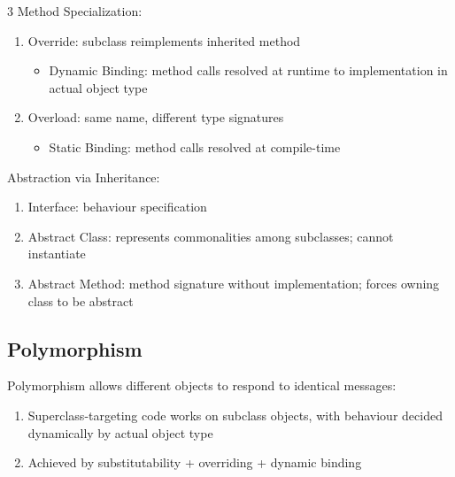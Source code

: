 \documentclass[12pt, a4paper]{article}
\begin{document}
\begin{multicols*}{3}
Method Specialization:
\begin{enumerate}[\roman*.]
  \item Override: subclass reimplements inherited method
    \begin{itemize}[leftmargin=*]\vspace{3pt}
      \item Dynamic Binding: method calls resolved at runtime to implementation in actual object type
    \end{itemize}
  \item Overload: same name, different type signatures
    \begin{itemize}[leftmargin=*]\vspace{3pt}
      \item Static Binding: method calls resolved at compile-time
    \end{itemize}
\end{enumerate}

Abstraction via Inheritance:
\begin{enumerate}[\roman*.]
  \item Interface: behaviour specification
\item Abstract Class: represents commonalities among subclasses; cannot instantiate 
  \item Abstract Method: method signature without implementation; forces owning class to be abstract
\end{enumerate}

\subsection{Polymorphism}

Polymorphism allows different objects to respond to identical messages:
\begin{enumerate}[\roman*.]
  \item Superclass-targeting code works on subclass objects, with behaviour decided dynamically by actual object type
  \item Achieved by substitutability + overriding + dynamic binding
\end{enumerate}

\colbreak

\end{multicols*}
\end{document}
